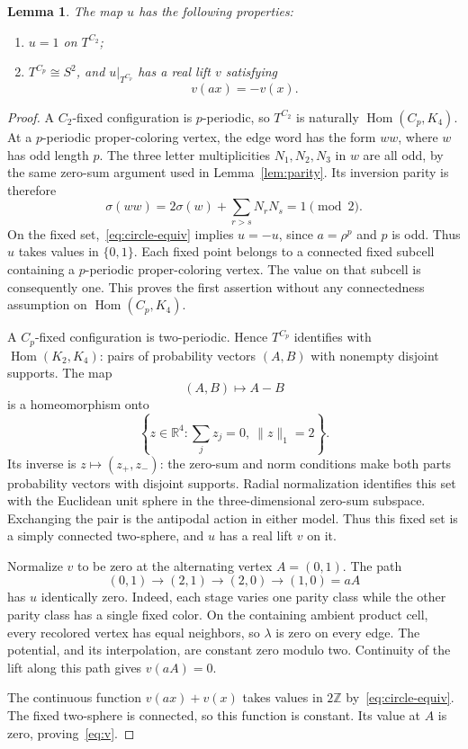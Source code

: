 \documentclass[11pt]{amsart}
\newtheorem{lemma}[theorem]{Lemma}
\theoremstyle{remark}
\numberwithin{equation}{section}
\newcommand{\R}{\mathbb R}
\newcommand{\Z}{\mathbb Z}
\newcommand{\Hom}{\operatorname{Hom}}
\begin{document}
\begin{lemma}\label{lem:fixed}
The map $u$ has the following properties:
\begin{enumerate}
\item $u=1$ on $T^{C_2}$;
\item $T^{C_p}\cong S^2$, and $u|_{T^{C_p}}$ has a real lift $v$ satisfying
\begin{equation}\label{eq:v}
 v(ax)=-v(x).
\end{equation}
\end{enumerate}
\end{lemma}
\begin{proof}
A $C_2$-fixed configuration is $p$-periodic, so $T^{C_2}$ is naturally $\Hom(C_p,K_4)$. At a $p$-periodic proper-coloring vertex, the edge word has the form $ww$, where $w$ has odd length $p$. The three letter multiplicities $N_1,N_2,N_3$ in $w$ are all odd, by the same zero-sum argument used in Lemma~\ref{lem:parity}. Its inversion parity is therefore
\[
 \sigma(ww)=2\sigma(w)+\sum_{r>s}N_rN_s=1\pmod2.
\]
On the fixed set,~\eqref{eq:circle-equiv} implies $u=-u$, since $a=\rho^p$ and $p$ is odd. Thus $u$ takes values in $\{0,1\}$. Each fixed point belongs to a connected fixed subcell containing a $p$-periodic proper-coloring vertex. The value on that subcell is consequently one. This proves the first assertion without any connectedness assumption on $\Hom(C_p,K_4)$.

A $C_p$-fixed configuration is two-periodic. Hence $T^{C_p}$ identifies with $\Hom(K_2,K_4)$: pairs of probability vectors $(A,B)$ with nonempty disjoint supports. The map
\[
 (A,B)\longmapsto A-B
\]
is a homeomorphism onto
\[
 \left\{z\in\R^4:\sum_j z_j=0,\ \|z\|_1=2\right\}.
\]
Its inverse is $z\mapsto(z_+,z_-)$: the zero-sum and norm conditions make both parts probability vectors with disjoint supports. Radial normalization identifies this set with the Euclidean unit sphere in the three-dimensional zero-sum subspace. Exchanging the pair is the antipodal action in either model. Thus this fixed set is a simply connected two-sphere, and $u$ has a real lift $v$ on it.

Normalize $v$ to be zero at the alternating vertex $A=(0,1)$. The path
\[
 (0,1)\to(2,1)\to(2,0)\to(1,0)=aA
\]
has $u$ identically zero. Indeed, each stage varies one parity class while the other parity class has a single fixed color. On the containing ambient product cell, every recolored vertex has equal neighbors, so $\lambda$ is zero on every edge. The potential, and its interpolation, are constant zero modulo two. Continuity of the lift along this path gives $v(aA)=0$.

The continuous function $v(ax)+v(x)$ takes values in $2\Z$ by~\eqref{eq:circle-equiv}. The fixed two-sphere is connected, so this function is constant. Its value at $A$ is zero, proving~\eqref{eq:v}.
\end{proof}
\end{document}
